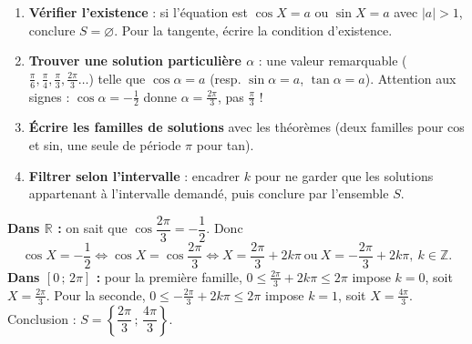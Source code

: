 \documentclass[11pt]{article}
\begin{document}
\begin{methode}[Résoudre $\cos X = a$, $\sin X = a$ ou $\tan X = a$]
\begin{enumerate}
\item \textbf{Vérifier l'existence} : si l'équation est $\cos X = a$ ou $\sin X = a$ avec $|a|>1$, conclure $S = \varnothing$. Pour la tangente, écrire la condition d'existence.
\item \textbf{Trouver une solution particulière $\alpha$} : une valeur remarquable ($\frac{\pi}{6}, \frac{\pi}{4}, \frac{\pi}{3}, \frac{2\pi}{3}\dots$) telle que $\cos\alpha = a$ (resp. $\sin\alpha = a$, $\tan\alpha = a$). Attention aux signes : $\cos\alpha = -\frac12$ donne $\alpha = \frac{2\pi}{3}$, pas $\frac{\pi}{3}$ !
\item \textbf{Écrire les familles de solutions} avec les théorèmes (deux familles pour cos et sin, une seule de période $\pi$ pour tan).
\item \textbf{Filtrer selon l'intervalle} : encadrer $k$ pour ne garder que les solutions appartenant à l'intervalle demandé, puis conclure par l'ensemble $S$.
\end{enumerate}
\end{methode}

\begin{exemplebox}[Résolution de $\cos X = -\dfrac{1}{2}$]
\textbf{Dans $\mathbb{R}$ :} on sait que $\cos\dfrac{2\pi}{3} = -\dfrac{1}{2}$. Donc
\[ \cos X = -\frac12 \iff \cos X = \cos\frac{2\pi}{3} \iff X = \frac{2\pi}{3} + 2k\pi \ \text{ou}\ X = -\frac{2\pi}{3} + 2k\pi,\ k\in\mathbb{Z}. \]
\textbf{Dans $[0\,;\,2\pi]$ :} pour la première famille, $0 \le \frac{2\pi}{3} + 2k\pi \le 2\pi$ impose $k = 0$, soit $X = \frac{2\pi}{3}$. Pour la seconde, $0 \le -\frac{2\pi}{3} + 2k\pi \le 2\pi$ impose $k = 1$, soit $X = \frac{4\pi}{3}$. Conclusion : $S = \left\lbrace \dfrac{2\pi}{3}\,;\,\dfrac{4\pi}{3} \right\rbrace$.
\end{exemplebox}
\end{document}
